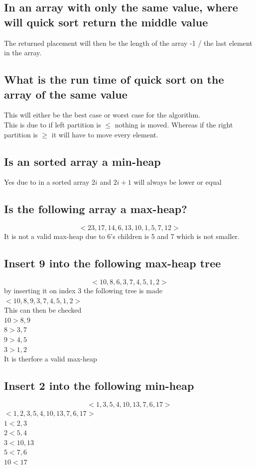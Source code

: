 \documentclass[12pt, a4paper]{article}
\begin{document}
			\subsection{In an array with only the same value, where will quick sort return the middle value}
				The returned placement will then be the length of the array -1 / the last element in the array.\\
			\subsection{What is the run time of quick sort on the  array of the same value}
				This will either be the best case or worst case for the algorithm.\\
				This is due to if left partition is $\leq$ nothing is moved. Whereas if the right partition is $\geq$ it will have to move every element.
			\subsection{Is an sorted array a min-heap}
				Yes due to in a sorted array $2i$ and $2i+1$ will always be lower or equal
			\subsection{Is the following array a max-heap?}
				$$<23,17,14,6,13,10,1,5,7,12>$$
				It is not a valid max-heap due to 6's children is 5 and 7 which is not smaller.
			\subsection{Insert 9 into the following max-heap tree}
				$$<10,8,6,3,7,4,5,1,2>$$
				by inserting it on index 3 the following tree is made\\
				$<10,8,9,3,7,4,5,1,2>$\\
				This can then be checked\\
				$10 > 8,9$\\
				$8 > 3,7$\\
				$9 > 4,5$\\
				$3 > 1,2$\\
				It is therfore a valid max-heap
			\subsection{Insert 2 into the following min-heap}
				$$<1,3,5,4,10,13,7,6,17>$$
				$<1,2,3,5,4,10,13,7,6,17>$\\
				$1 < 2,3$\\
				$2 < 5,4$\\
				$3 < 10,13$\\
				$5 < 7,6$\\
				$10 < 17$
\end{document}
